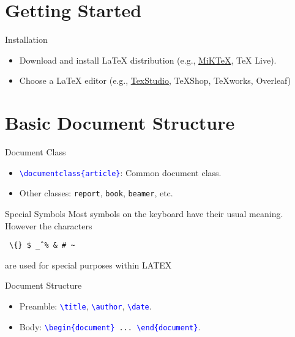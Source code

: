 \documentclass{beamer}
\begin{document}
	
	\section{Getting Started}
	
	\begin{frame}{Installation}
		\begin{itemize}
			\item Download and install LaTeX distribution (e.g., \underline{MiKTeX}, TeX Live).
			\item Choose a LaTeX editor (e.g., \underline{TexStudio}, TeXShop, TeXworks, Overleaf)
		\end{itemize}
	\end{frame}
	
	\section{Basic Document Structure}

	\begin{frame}{Document Class}
		\begin{itemize}
			\item \texttt{\textcolor{blue}{\textbackslash documentclass\{article\}}}: Common document class.
			\item Other classes: \texttt{report}, \texttt{book}, \texttt{beamer}, etc.
		\end{itemize}
	\end{frame}
	
	\begin{frame}{Special Symbols}
		Most symbols on the keyboard have their usual meaning. However the characters \par
		
		 \texttt{ \textbackslash \{\} \$ \^ \_ \% \& \# \~ } \par
		
		are used for special purposes within LATEX
	\end{frame}
	
	\begin{frame}{Document Structure}
		\begin{itemize}
			\item Preamble: \texttt{\textcolor{blue}{\textbackslash title}}, \texttt{\textcolor{blue}{\textbackslash author}}, \texttt{\textcolor{blue}{\textbackslash date}}.
			\item Body: \texttt{\textcolor{blue}{\textbackslash begin\{document\}} ... \textcolor{blue}{\textbackslash end\{document\}}}.
		\end{itemize}
	\end{frame}
	
\end{document}
